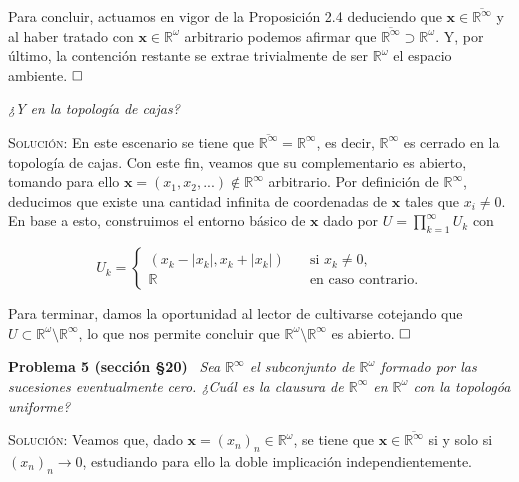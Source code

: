 \documentclass[11pt]{article}
\begin{document}
Para concluir, actuamos en vigor de la Proposición 2.4 deduciendo que $\mathbf{x} \in \overline{\mathbb{R}^{\infty}}$ y al haber tratado con $\mathbf{x} \in \mathbb{R}^{\omega}$ arbitrario podemos afirmar que $\overline{\mathbb{R}^{\infty}} \supset \mathbb{R}^{\omega}$. Y, por último, la contención restante se extrae trivialmente de ser $\mathbb{R}^\omega$ el espacio ambiente. $\hfill\square$

\bigskip

\noindent\textit{¿Y en la topología de cajas?}

\medskip

\noindent\textsc{Solución}: En este escenario se tiene que $\overline{\mathbb{R}^\infty} = \mathbb{R}^\infty$, es decir, $\mathbb{R}^\infty$ es cerrado en la topología de cajas. Con este fin, veamos que su complementario es abierto, tomando para ello $\mathbf{x} = (x_1, x_2, ...) \notin \mathbb{R}^\infty$ arbitrario. Por definición de $\mathbb{R}^\infty$, deducimos que existe una cantidad infinita de coordenadas de $\mathbf{x}$ tales que $x_i \neq 0$. En base a esto, construimos el entorno básico de $\mathbf{x}$ dado por $U = \prod_{k=1}^{\infty} U_k$ con

\begin{equation*}
    U_k = \begin{cases}
        (x_k - |x_k|, x_k + |x_k|) \quad & \text{si $x_k \neq 0$,} \\
        \mathbb{R} & \text{en caso contrario.}
    \end{cases}
\end{equation*}

Para terminar, damos la oportunidad al lector de cultivarse cotejando que $U \subset \mathbb{R}^\omega \setminus \mathbb{R}^\infty$, lo que nos permite concluir que $\mathbb{R}^\omega \setminus \mathbb{R}^\infty$ es abierto. $\hfill\square$

\bigskip

\noindent\textbf{Problema 5 (sección \S 20)} \, \textit{Sea $\mathbb{R}^\infty$ el subconjunto de $\mathbb{R}^\omega$ formado por las sucesiones eventualmente cero. ¿Cuál es la clausura de $\mathbb{R}^\infty$ en $\mathbb{R}^\omega$ con la topologóa uniforme?}

\medskip

\noindent\textsc{Solución}: Veamos que, dado $\mathbf{x} = (x_n)_n \in \mathbb{R}^\omega$, se tiene que $\mathbf{x} \in \overline{\mathbb{R}^\infty}$ si y solo si $(x_n)_n \to 0$, estudiando para ello la doble implicación independientemente.
\end{document}
